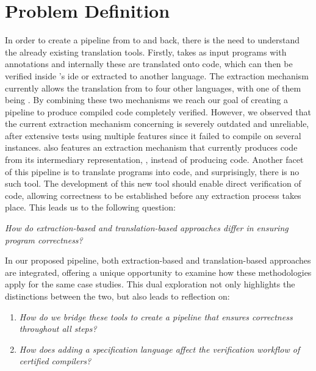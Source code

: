 \section{Problem Definition}
\label{sec:Problem_Definition}

In order to create a pipeline from \ocaml to \cml and back, there is the need to understand the already existing translation tools.
Firstly, \cameleer takes as input \ocaml programs with \gospel annotations and internally these are translated onto \whyml code, which
can then be verified inside \whythree's ide or extracted to another language. The \whythree extraction mechanism currently allows the 
translation from \whyml to four other languages, with one of them being \cml. By combining these two mechanisms we reach our goal
of creating a pipeline to produce compiled code completely verified. However, we observed that the current extraction mechanism 
concerning \cml is severely outdated and unreliable, after extensive tests using multiple \ocaml features since it failed to compile 
on several instances. \cameleer also features an extraction mechanism that currently produces \ocaml code from its intermediary
representation, \whyml, instead of producing \cml code. Another facet of this pipeline is to translate \cml programs into \ocaml
code, and surprisingly, there is no such tool. The development of this new tool should enable direct verification of \cml code, 
allowing correctness to be established before any extraction process takes place. This leads us to the following question: 

\vspace{5mm}
\centerline{\textit{How do extraction-based and translation-based approaches differ in ensuring program correctness?}}

In our proposed pipeline, both extraction-based and translation-based approaches are integrated, offering a unique opportunity 
to examine how these methodologies apply for the same case studies. This dual exploration not only highlights the distinctions 
between the two, but also leads to reflection on:

\begin{enumerate}
    \item \textit{How do we bridge these tools to create a pipeline that ensures correctness throughout all steps?}
    \item \textit{How does adding a specification language affect the verification workflow of certified compilers?}
\end{enumerate}


